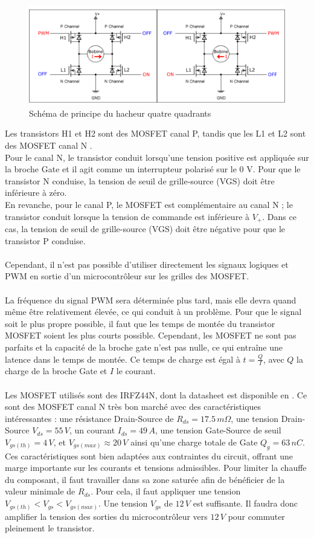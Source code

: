\documentclass{article}
\begin{document}
  \begin{figure}[H]
    \centering
    \includegraphics[width=0.7\linewidth]{Images/pontH_Mosfet.png}
    \caption{Schéma de principe du hacheur quatre quadrants}
    \label{fig:pontH_mosfet}
\end{figure}
\noindent
Les transistors H1 et H2 sont des MOSFET canal P, tandis que les L1 et L2 sont des MOSFET canal N .
\\
Pour le canal N, le transistor conduit lorsqu'une tension positive est appliquée sur la broche Gate et il agit comme un interrupteur polarisé sur le 0 V. Pour que le transistor N conduise, la tension de seuil de grille-source (VGS) doit être inférieure à zéro.
\\
En revanche, pour le canal P, le MOSFET est complémentaire au canal N ; le transistor conduit lorsque la tension de commande est inférieure à $V_{+}$. Dans ce cas, la tension de seuil de grille-source (VGS) doit être négative pour que le transistor P conduise.
\\\\
Cependant, il n'est pas possible d'utiliser directement les signaux logiques et PWM en sortie d'un microcontrôleur sur les grilles des MOSFET.
\\\\
La fréquence du signal PWM sera déterminée plus tard, mais elle devra quand même être relativement élevée, ce qui conduit à un problème. Pour que le signal soit le plus propre possible, il faut que les temps de montée du transistor MOSFET soient les plus courts possible. Cependant, les MOSFET ne sont pas parfaits et la capacité de la broche gate n'est pas nulle, ce qui entraîne une latence dans le temps de montée. Ce temps de charge est égal à $t=\frac{Q}{I}$, avec $Q$ la charge de la broche Gate et $I$ le courant.
\\\\
Les MOSFET utilisés sont des IRFZ44N, dont la datasheet est disponible en \cite{ref10}. Ce sont des MOSFET canal N très bon marché avec des caractéristiques intéressantes : une résistance Drain-Source de $R_{ds}=17.5\,m\Omega$, une tension Drain-Source $V_{ds}=55\,V$, un courant $I_{ds}=49\,A$, une tension Gate-Source de seuil $V_{gs(th)}=4\,V$, et $V_{gs(max)}\approx 20\,V$ ainsi qu'une charge totale de Gate $Q_{g}=63\,nC$. Ces caractéristiques sont bien adaptées aux contraintes du circuit, offrant une marge importante sur les courants et tensions admissibles. Pour limiter la chauffe du composant, il faut travailler dans sa zone saturée afin de bénéficier de la valeur minimale de $R_{ds}$. Pour cela, il faut appliquer une tension $V_{gs(th)}<V_{gs}<V_{gs(max)}$. Une tension $V_{gs}$ de $12\,V$ est suffisante. Il faudra donc amplifier la tension des sorties du microcontrôleur vers $12\,V$ pour commuter pleinement le transistor.
\end{document}
